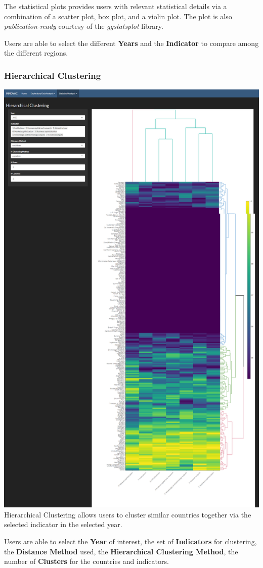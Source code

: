 \documentclass[
]{article}
\begin{document}
The statistical plots provides users with relevant statistical details
via a combination of a scatter plot, box plot, and a violin plot. The
plot is also \emph{publication-ready} courtesy of the \emph{ggstatsplot}
library.

Users are able to select the different \textbf{Years} and the
\textbf{Indicator} to compare among the different regions.

\hypertarget{hierarchical-clustering}{%
\subsubsection{Hierarchical Clustering}\label{hierarchical-clustering}}

\includegraphics{./images/hclust.png} Hierarchical Clustering allows
users to cluster similar countries together via the selected indicator
in the selected year.

Users are able to select the \textbf{Year} of interest, the set of
\textbf{Indicators} for clustering, the \textbf{Distance Method} used,
the \textbf{Hierarchical Clustering Method}, the number of
\textbf{Clusters} for the countries and indicators.
\end{document}
